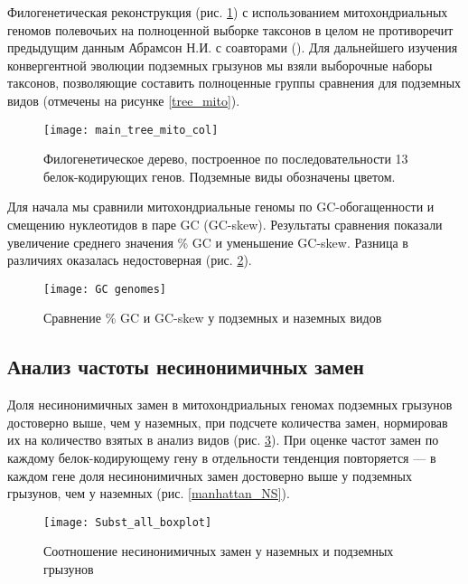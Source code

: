 Филогенетическая реконструкция (рис. \ref{Tree_13_genes}) с использованием митохондриальных геномов полевочьих на полноценной выборке таксонов в целом не противоречит предыдущим данным Абрамсон Н.И. с соавторами (\cite{Abramson2009}). Для дальнейшего изучения конвергентной эволюции подземных грызунов мы взяли выборочные наборы таксонов, позволяющие составить полноценные группы сравнения для подземных видов (отмечены на рисунке \ref{tree_mito}). 

\begin{figure}[h!]
\begin{center}
	\texttt{[image: main\_tree\_mito\_col]}
\end{center}
	\caption{Филогенетическое дерево, построенное по последовательности 13 белок-кодирующих генов. Подземные виды обозначены цветом.}
	\label{Tree_13_genes}
\end{figure}


Для начала мы сравнили митохондриальные геномы по GC-обогащенности и смещению нуклеотидов в паре GC (GC-skew). Результаты сравнения показали увеличение среднего значения \% GC и уменьшение GC-skew. Разница в различиях оказалась недостоверная (рис. \ref{boxplot_GC_GSskew}). 

\begin{figure}[h!]
\begin{center}
	\texttt{[image: GC genomes]}
\end{center}
\caption{Сравнение \% GC и GC-skew у подземных и наземных видов}\label{boxplot_GC_GSskew}
\end{figure}


\subsection{Анализ частоты несинонимичных замен}

Доля несинонимичных замен в митохондриальных геномах подземных грызунов достоверно выше, чем у наземных, при подсчете количества замен, нормировав их на количество взятых в анализ видов (рис. \ref{boxplot_NS}). При оценке частот замен по каждому белок-кодирующему гену в отдельности тенденция повторяется --- в каждом гене доля несинонимичных замен достоверно выше у подземных грызунов, чем у наземных (рис. \ref{manhattan_NS}).

\begin{figure}[h!]
\begin{center}
	\texttt{[image: Subst\_all\_boxplot]}
\end{center}
	\caption{Соотношение несинонимичных замен у наземных и подземных грызунов}\label{boxplot_NS}
\end{figure}


